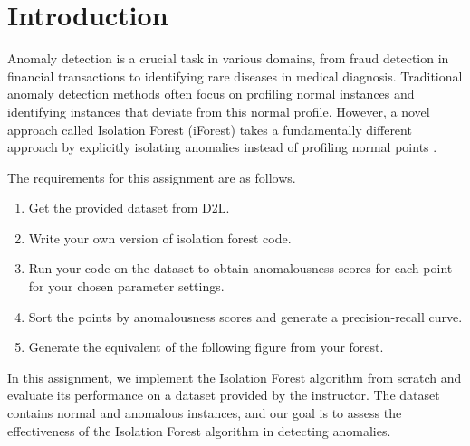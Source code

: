 \section{Introduction}
Anomaly detection is a crucial task in various domains, from fraud detection in financial transactions to identifying rare diseases in medical diagnosis. Traditional anomaly detection methods often focus on profiling normal instances and identifying instances that deviate from this normal profile. However, a novel approach called Isolation Forest (iForest) takes a fundamentally different approach by explicitly isolating anomalies instead of profiling normal points \cite{liu2008isolation}.

The requirements for this assignment are as follows\cite{assignment7}.\par
\begin{enumerate}
    \item Get the provided dataset from D2L.
    \item Write your own version of isolation forest code.
    \item Run your code on the dataset to obtain anomalousness scores for each point for your chosen parameter settings.
    \item Sort the points by anomalousness scores and generate a precision-recall curve.
    \item Generate the equivalent of the following figure from your forest.
    
\end{enumerate}

In this assignment, we implement the Isolation Forest algorithm from scratch and evaluate its performance on a dataset provided by the instructor. The dataset contains normal and anomalous instances, and our goal is to assess the effectiveness of the Isolation Forest algorithm in detecting anomalies.